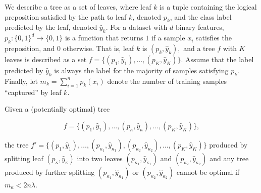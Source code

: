 \documentclass{article}
\begin{document}
      \begin{theorem}
      We describe a tree as a set of leaves, where leaf $k$ is a tuple containing the logical preposition satisfied by the path to leaf $k$, denoted $p_k $, and the class label predicted by the leaf, denoted $\hat{y}_k$. For a dataset with $d$ binary features, $p_k: \{0, 1\}^d \to \{0, 1\}$ is a function that returns $1$ if a sample $x_i$ satisfies the preposition, and $0$ otherwise. That is, leaf $k$ is $(p_k, \hat{y}_k),$ and a tree $f$ with $K$ leaves is described as a set $f = \{(p_1, \hat{y}_1), \hdots, (p_K, \hat{y}_K)\}$. Assume that the label predicted by $\hat{y}_k$ is always the label for the majority of samples satisfying $p_k$. Finally, let $m_k = \sum_{i=1}^n p_k(x_i)$ denote the number of training samples ``captured'' by leaf $k$.

      Given a (potentially optimal) tree 

        \[f = \{(p_1, \hat{y}_1), \hdots, (p_{\kappa}, \hat{y}_{\kappa}), \hdots, (p_K, \hat{y}_K)\}, \]

      the tree $f' = \{(p_1, \hat{y}_1), \hdots, (p_{\kappa_1}, \hat{y}_{\kappa_1}), (p_{\kappa_2}, \hat{y}_{\kappa_2}), \hdots, (p_K, \hat{y}_K)\}$ produced by splitting leaf $(p_{\kappa}, \hat{y}_{\kappa})$ into two leaves $(p_{\kappa_1}, \hat{y}_{\kappa_1})$ and $(p_{\kappa_2}, \hat{y}_{\kappa_2})$ and any tree produced by further splitting $(p_{\kappa_1}, \hat{y}_{\kappa_1})$ or $(p_{\kappa_2}, \hat{y}_{\kappa_2})$ cannot  be optimal if $m_{\kappa} < 2n\lambda$.
      \end{theorem}
\end{document}
